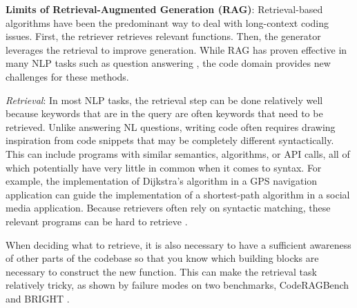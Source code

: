 
\textbf{Limits of Retrieval-Augmented Generation (RAG)}: Retrieval-based algorithms have been the predominant way to deal with long-context coding issues. First, the retriever retrieves relevant functions. Then, the generator leverages the retrieval to improve generation. While RAG has proven effective in many NLP tasks such as question answering \citep{gao2023retrieval, lewis2020retrieval}, the code domain provides new challenges for these methods.


\textit{Retrieval}: In most NLP tasks, the retrieval step can be done relatively well because keywords that are in the query are often keywords that need to be retrieved. Unlike answering NL questions, writing code often requires drawing inspiration from code snippets that may be completely different syntactically. This can include programs with similar semantics, algorithms, or API calls, all of which potentially have very little in common when it comes to syntax. For example, the implementation of Dijkstra's algorithm in a GPS navigation application can guide the implementation of a shortest-path algorithm in a social media application. Because retrievers often rely on syntactic matching, these relevant programs can be hard to retrieve \citep{ma2024unveiling, utpala2023language}.

When deciding what to retrieve, it is also necessary to have a sufficient awareness of other parts of the codebase so that you know which building blocks are necessary to construct the new function. This can make the retrieval task relatively tricky, as shown by failure modes on two benchmarks, CodeRAGBench \citep{wang2024coderag} and BRIGHT \citep{su2024bright}.


